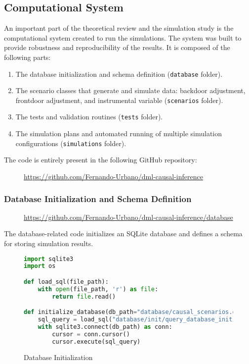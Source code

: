 \documentclass{article}
\numberwithin{equation}{section}
\begin{document}
\newpage

\subsection{Computational System}
\label{subsec:appendix_computational_system}

An important part of the theoretical review and the simulation study is the computational system created to run the simulations. The system was built to provide robustness and reproducibility of the results. It is composed of the following parts:

\begin{enumerate}[label=\roman*.]
    \item The database initialization and schema definition (\texttt{database} folder).
    \item The scenario classes that generate and simulate data: backdoor adjustment, frontdoor adjustment, and instrumental variable (\texttt{scenarios} folder).
    \item The tests and validation routines (\texttt{tests} folder).
    \item The simulation plans and automated running of multiple simulation configurations (\texttt{simulations} folder).
\end{enumerate}

The code is entirely present in the following GitHub repository:

\begin{figure}[H]
    \centering
    \url{https://github.com/Fernando-Urbano/dml-causal-inference}
\end{figure}

\subsubsection{Database Initialization and Schema Definition}

\begin{figure}[H]
    \centering
    \url{https://github.com/Fernando-Urbano/dml-causal-inference/database}
\end{figure}

The database-related code initializes an SQLite database and defines a schema for storing simulation results.

\begin{figure}[H]
\begin{lstlisting}[language=python]
import sqlite3
import os

def load_sql(file_path):
    with open(file_path, 'r') as file:
        return file.read()

def initialize_database(db_path="database/causal_scenarios.db"):
    sql_query = load_sql("database/init/query_database_initialization.sql")
    with sqlite3.connect(db_path) as conn:
        cursor = conn.cursor()
        cursor.execute(sql_query)
\end{lstlisting}
\caption{Database Initialization}
\end{figure}
\end{document}
